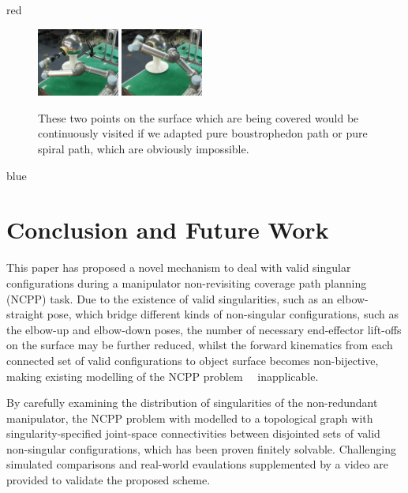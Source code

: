 \documentclass[Afour,sageh,times]{sagej}
\begin{document}
\begin{color}{red}
\begin{figure}[t]
\centering
\includegraphics[width = 0.24\textwidth]{figures/real_world/show_demo_of_two_colours/demo_2}
\includegraphics[width = 0.24\textwidth]{figures/real_world/show_demo_of_two_colours/demo_3}
\caption{These two points on the surface which are being covered would be continuously visited if we adapted pure boustrophedon path or pure spiral path, which are obviously impossible. }\label{fig:two_points}
\end{figure}
\end{color}

\begin{color}{blue}
\section{Conclusion and Future Work}\label{section_conclusion}
This paper has proposed a novel mechanism to deal with valid singular configurations during a manipulator non-revisiting coverage path planning (NCPP) task. 
Due to the existence of valid singularities, such as an elbow-straight pose, which bridge different kinds of non-singular configurations, such as the elbow-up and elbow-down poses, the number of necessary end-effector lift-offs on the surface may be further reduced, whilst the forward kinematics from each connected set of valid configurations to object surface becomes non-bijective, making existing modelling of the NCPP problem~\cite{Yang2020Cellular}~\cite{Yang2020Nonrevisiting} inapplicable. 

By carefully examining the distribution of singularities of the non-redundant manipulator, the NCPP problem with modelled to a topological graph with singularity-specified joint-space connectivities between disjointed sets of valid non-singular configurations, which has been proven finitely solvable. 
Challenging simulated comparisons and real-world evaulations supplemented by a video are provided to validate the proposed scheme.
\end{color}
\end{document}

